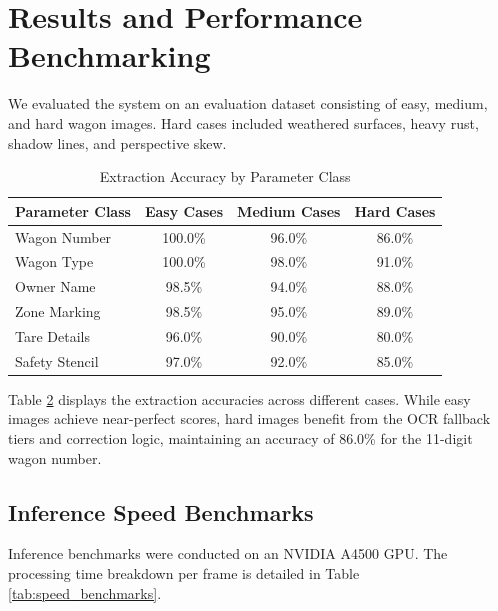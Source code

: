 \documentclass[conference]{IEEEtran}
\begin{document}
\begin{table}[t]
\section{Results and Performance Benchmarking}
We evaluated the system on an evaluation dataset consisting of easy, medium, and hard wagon images. Hard cases included weathered surfaces, heavy rust, shadow lines, and perspective skew.

\begin{table}[htbp]
\caption{Extraction Accuracy by Parameter Class}
\begin{center}
\begin{tabular}{lccc}
\toprule
\textbf{Parameter Class} & \textbf{Easy Cases} & \textbf{Medium Cases} & \textbf{Hard Cases} \\
\midrule
Wagon Number   & 100.0\% & 96.0\% & 86.0\% \\
Wagon Type     & 100.0\% & 98.0\% & 91.0\% \\
Owner Name     & 98.5\%  & 94.0\% & 88.0\% \\
Zone Marking   & 98.5\%  & 95.0\% & 89.0\% \\
Tare Details   & 96.0\%  & 90.0\% & 80.0\% \\
Safety Stencil & 97.0\%  & 92.0\% & 85.0\% \\
\bottomrule
\end{tabular}
\label{tab:class_accuracies}
\end{center}
\end{table}

Table \ref{tab:class_accuracies} displays the extraction accuracies across different cases. While easy images achieve near-perfect scores, hard images benefit from the OCR fallback tiers and correction logic, maintaining an accuracy of 86.0\% for the 11-digit wagon number.

\subsection{Inference Speed Benchmarks}
Inference benchmarks were conducted on an NVIDIA A4500 GPU. The processing time breakdown per frame is detailed in Table \ref{tab:speed_benchmarks}.


\end{table}
\end{document}
